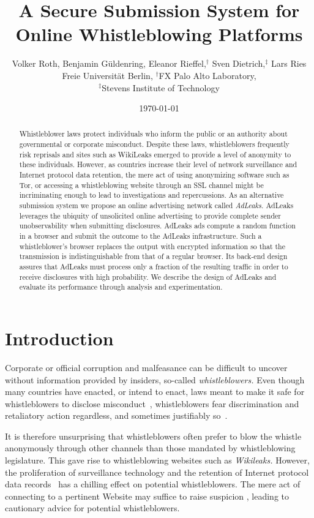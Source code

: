 \documentclass[twocolumn,10pt]{article}
\title{A Secure Submission System for Online Whistleblowing Platforms}
\author{Volker Roth, Benjamin G\"uldenring, Eleanor Rieffel,$^{\dag}$ Sven
  Dietrich,$^{\ddag}$ Lars Ries\\[1.2ex]
  Freie Universit\"at Berlin, $^\dag$FX Palo Alto Laboratory,\\
  $^\ddag$Stevens Institute of Technology}
\date{\today}
\begin{document}
\maketitle

\begin{abstract}
  Whistleblower laws protect individuals who inform the public or an
  authority about governmental or corporate misconduct.  Despite these laws,
  whistleblowers frequently risk reprisals and sites such as WikiLeaks
  emerged to provide a level of anonymity to these individuals.  However, as
  countries increase their level of network surveillance and Internet
  protocol data retention, the mere act of using anonymizing software such
  as Tor, or accessing a whistleblowing website through an SSL channel might
  be incriminating enough to lead to investigations and repercussions.  As
  an alternative submission system we propose an online advertising network
  called \emph{AdLeaks.}  AdLeaks leverages the ubiquity of unsolicited
  online advertising to provide complete sender unobservability when
  submitting disclosures.  AdLeaks ads compute a random function in a
  browser and submit the outcome to the AdLeaks infrastructure.  Such a
  whistleblower's browser replaces the output with encrypted information so
  that the transmission is indistinguishable from that of a regular browser.
  Its back-end design assures that AdLeaks must process only a fraction of
  the resulting traffic in order to receive disclosures with high
  probability.  We describe the design of AdLeaks and evaluate its
  performance through analysis and experimentation.
\end{abstract}


\section{Introduction}



Corporate or official corruption and malfeasance can be difficult to uncover
without information provided by insiders, so-called \emph{whistleblowers.}
Even though many countries have enacted, or intend to enact, laws meant to
make it safe for whistleblowers to disclose
misconduct~\cite{Banisar2009,OsterhausF2009}, whistleblowers fear
discrimination and retaliatory action regardless, and sometimes justifiably
so~\cite{ERC2012,Lennane1993}.

It is therefore unsurprising that whistleblowers often prefer to blow the
whistle anonymously through other channels than those mandated by
whistleblowing legislature.  This gave rise to whistleblowing websites such
as \emph{Wikileaks.}  However, the proliferation of surveillance technology
and the retention of Internet protocol data records~\cite{BertholdBK2009}
has a chilling effect on potential whistleblowers.  The mere act of
connecting to a pertinent Website may suffice to raise suspicion
\cite{Gustin2010}, leading to cautionary advice for potential
whistleblowers.
\end{document}
